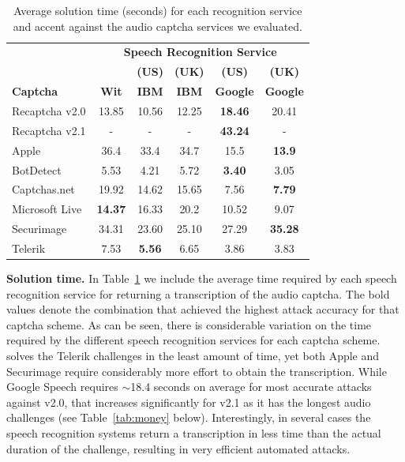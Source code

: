 \begin{table}[t]
\centering
\caption{Average solution time (seconds) for each recognition service and accent against the audio captcha services we evaluated.}
\begin{tabular}{lccccc}
\toprule
&\multicolumn{5}{c}{\textbf{Speech Recognition Service}}\\
\cmidrule{2-6}
& & \textbf{(US)} & \textbf{(UK)} & \textbf{(US)} & \textbf{(UK)} \\
\textbf{Captcha}&  \textbf{Wit} & \textbf{IBM} & \textbf{IBM} & \textbf{Google} & \textbf{Google} \\
\hline
Recaptcha v2.0 & 13.85 & 10.56  & 12.25 & \textbf{18.46} & 20.41 \\
\rowcolor{Gray}
Recaptcha v2.1 & -  & -  & - & \textbf{43.24} & - \\
Apple  & 36.4 & 33.4  & 34.7 & 15.5 & \textbf{13.9} \\
\rowcolor{Gray}
BotDetect  & 5.53  & 4.21 & 5.72 & \textbf{3.40} & 3.05 \\
Captchas.net  & 19.92  & 14.62  & 15.65  & 7.56 & \textbf{7.79} \\
\rowcolor{Gray}
Microsoft Live & \textbf{14.37}  & 16.33 & 20.2  & 10.52  & 9.07 \\
Securimage  & 34.31 & 23.60 & 25.10  & 27.29 & \textbf{35.28} \\
\rowcolor{Gray}
Telerik  & 7.53 & \textbf{5.56} & 6.65 & 3.86 & 3.83 \\
\bottomrule
\end{tabular}
\label{tab:solution_time}
\end{table}

\textbf{Solution time.} In Table~\ref{tab:solution_time} we include the average time required by each speech recognition 
service for returning a transcription of the audio captcha. The bold values denote the combination that achieved the highest 
attack accuracy for that captcha scheme. As can be seen, there is considerable variation on the time required by the different speech 
recognition services for each captcha scheme. \system solves the Telerik challenges in the least amount of time, yet both
Apple and Securimage require considerably more effort to obtain the transcription. While Google Speech requires $\sim$18.4 
seconds on average for most accurate attacks against \re v2.0, that increases significantly for v2.1 as it has the longest
audio challenges (see Table~\ref{tab:money} below). Interestingly, in several cases the speech recognition systems return
a transcription in less time than the actual duration of the challenge, resulting in very efficient automated attacks.

